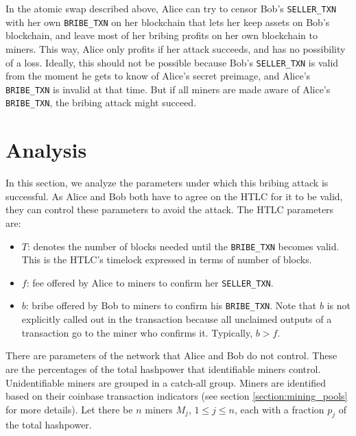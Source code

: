 \documentclass[runningheads]{llncs}
\newcommand{\sellertxn}{\texttt{SELLER\_TXN}}
\newcommand{\bribetxn}{\texttt{BRIBE\_TXN}}
\begin{document}
In the atomic swap described above, Alice can try to censor Bob's \sellertxn{} with her own \bribetxn{} on her blockchain that lets her keep assets on Bob's blockchain, and leave most of her bribing profits on her own blockchain to miners. This way, Alice only profits if her attack succeeds, and has no possibility of a loss. Ideally, this should not be possible because Bob's \sellertxn{} is valid from the moment he gets to know of Alice's secret preimage, and Alice's \bribetxn{} is invalid at that time. But if all miners are made aware of Alice's \bribetxn{}, the bribing attack might succeed.

\section{Analysis}
In this section, we analyze the parameters under which this bribing attack is successful. As Alice and Bob both have to agree on the HTLC for it to be valid, they can control these parameters to avoid the attack. The HTLC parameters are:
\begin{itemize}
    \item $T$: denotes the number of blocks needed until the \bribetxn{} becomes valid. This is the HTLC's timelock expressed in terms of number of blocks.
    \item $f$: fee offered by Alice to miners to confirm her \sellertxn{}.
    \item $b$: bribe offered by Bob to miners to confirm his \bribetxn{}. Note that $b$ is not explicitly called out in the transaction because all unclaimed outputs of a transaction go to the miner who confirms it. Typically, $b > f$.
\end{itemize}
There are parameters of the network that Alice and Bob do not control. These are the percentages of the total hashpower that identifiable miners control. Unidentifiable miners are grouped in a catch-all group. Miners are identified based on their coinbase transaction indicators (see section \ref{section:mining_pools} for more details). Let there be $n$ miners $M_j$, $1\leq j \leq n$, each with a fraction $p_j$ of the total hashpower.
\end{document}
